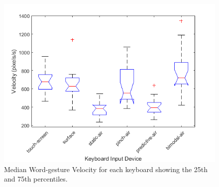 \begin{figure}[t]
	\centering
	\includegraphics{Figures/fig_velocity_gesture_boxplot}
	\caption[Word-gesture Velocity Boxplot]{Median Word-gesture Velocity for each keyboard showing the 25th and 75th percentiles.}
	\label{fig_velocity_gesture_boxplot}
\end{figure}

